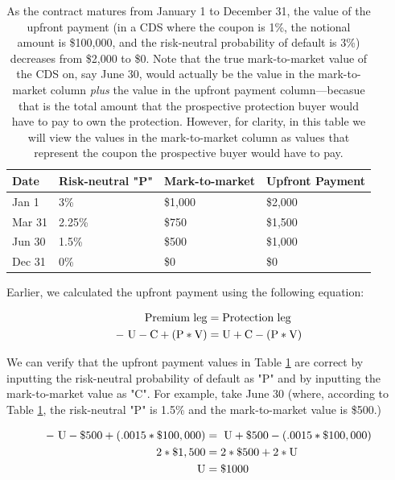 \documentclass[article]{jss}
\begin{document}
\begin{table}[H]
\centering
{\footnotesize
\begin{tabular}{llll}
  \hline
Date & Risk-neutral "P" & Mark-to-market & Upfront Payment \\ 
  \hline
  Jan 1 & 3\% & \$1,000 & \$2,000  \\ 
  Mar 31 & 2.25\% & \$750 & \$1,500 \\ 
  Jun 30 & 1.5\% & \$500 & \$1,000 \\ 
  Dec 31 & 0\% & \$0 & \$0 \\
   \hline
\end{tabular}
}
\caption{As the contract matures from January 1 to December 31, the value of the upfront payment (in a CDS where the coupon is 1\%, the notional amount is \$100,000, and the risk-neutral probability of default is 3\%) decreases from \$2,000 to \$0. Note that the true mark-to-market value of the CDS on, say June 30, would actually be the value in the mark-to-market column \emph{plus} the value in the upfront payment column---becasue that is the total amount that the prospective protection buyer would have to pay to own the protection. However, for clarity, in this table we will view the values in the mark-to-market column as values that represent the coupon the prospective buyer would have to pay.}
\label{tbl:upfrontValue}
\end{table}

Earlier, we calculated the upfront payment using the following equation:

\label{eqn:Upfront}
\begin{align}
  \rm Premium\hspace{3pt}leg &= \rm Protection\hspace{3pt}leg \\
  \rm -\hspace{3pt}U - C + (P * V) &= \rm U + C - (P * V)
\end{align}

We can verify that the upfront payment values in Table \ref{tbl:upfrontValue} are correct by inputting the risk-neutral probability of default as "P" and by inputting the mark-to-market value as "C". For example, take June 30 (where, according to Table \ref{tbl:upfrontValue}, the risk-neutral "P" is 1.5\% and the mark-to-market value is \$500.)

\begin{align}
  \rm -\hspace{3pt}U - \$500 + (.0015 * \$100,000) &= \rm \hspace{3pt}U + \$500 - (.0015 * \$100,000) \\
  \rm 2 * \$1,500 &= \rm 2 * \$500 + 2 * U \\
  \rm U &= \rm\$1000
\end{align}
\end{document}
